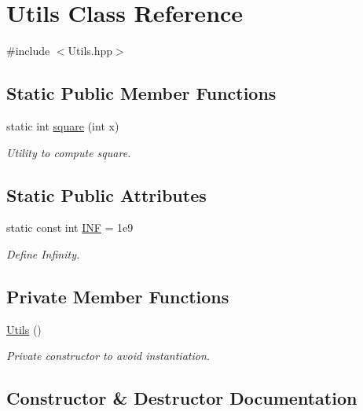 \hypertarget{classUtils}{}\section{Utils Class Reference}
\label{classUtils}


{\ttfamily \#include $<$Utils.\+hpp$>$}

\subsection*{Static Public Member Functions}
\begin{DoxyCompactItemize}
\item 
static int \mbox{\hyperlink{classUtils_a4a82c02c4e80280dc05f15f9c2277413}{square}} (int x)
\begin{DoxyCompactList}\small\item\em Utility to compute square. \end{DoxyCompactList}\end{DoxyCompactItemize}
\subsection*{Static Public Attributes}
\begin{DoxyCompactItemize}
\item 
static const int \mbox{\hyperlink{classUtils_ade3d4413a974dbaa25f1619a4516946b}{I\+NF}} = 1e9
\begin{DoxyCompactList}\small\item\em Define Infinity. \end{DoxyCompactList}\end{DoxyCompactItemize}
\subsection*{Private Member Functions}
\begin{DoxyCompactItemize}
\item 
\mbox{\hyperlink{classUtils_a452e78692c87ed5c7c993b6c6ac4981a}{Utils}} ()
\begin{DoxyCompactList}\small\item\em Private constructor to avoid instantiation. \end{DoxyCompactList}\end{DoxyCompactItemize}


\subsection{Constructor \& Destructor Documentation}
\mbox{\label{classUtils_a452e78692c87ed5c7c993b6c6ac4981a}} 
